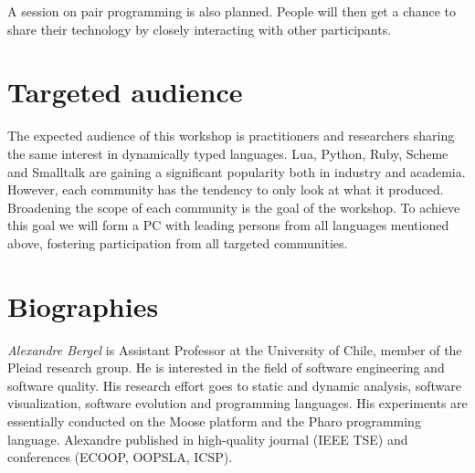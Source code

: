 \documentclass[runningheads]{llncs}
\newcommand\AK[1]{\nb{akuhn}{#1}}
\begin{document}
A session on pair programming is also planned. People will then get a chance to share their technology by closely interacting with other participants. 


\section{Targeted audience}

The expected audience of this workshop is practitioners and researchers sharing the same interest in dynamically typed languages. Lua, Python, Ruby, Scheme and Smalltalk are gaining a significant popularity both in industry and academia. However, each community has the tendency to only look at what it produced. Broadening the scope of each community is the goal of the workshop. To achieve this goal we will form a PC with leading persons from all languages mentioned above, fostering participation from all targeted communities.


\section{Biographies}

\noindent \emph{Alexandre Bergel} is Assistant Professor at the University of Chile, member of the Pleiad research group. He is interested in the field of software engineering and software quality. His research effort goes to static and dynamic analysis, software visualization, software evolution and programming languages. His experiments are essentially conducted on the Moose platform and the Pharo programming language. Alexandre published in high-quality journal (IEEE TSE) and conferences (ECOOP, OOPSLA, ICSP).\\

\end{document}
